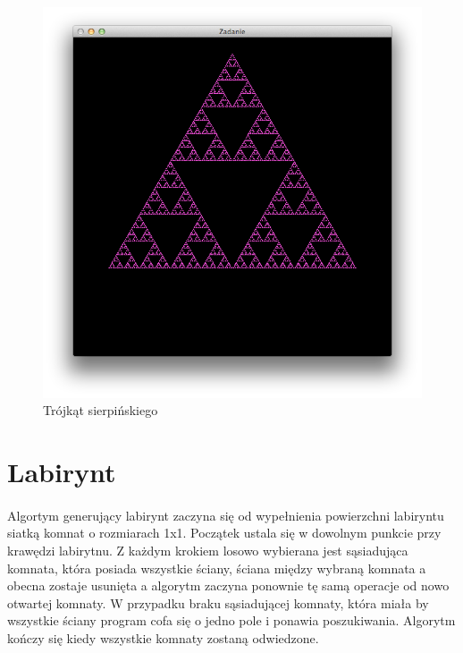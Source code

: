 \documentclass[wide,a4paper,titlepage,12pt] {article}
\begin{document}
  \paragraph{}

  

  \begin{figure}[htbp]
    \begin{center}
      \includegraphics[scale=0.6]{trojkat.png}
      \caption{Trójkąt sierpińskiego}
    \end{center}
  \end{figure}


  \newpage


  \section{Labirynt}
  \paragraph{}

  Algortym generujący labirynt zaczyna się od wypełnienia powierzchni labiryntu siatką komnat o rozmiarach 1x1.
  Początek ustala się w dowolnym punkcie przy krawędzi labirytnu.
  Z każdym krokiem losowo wybierana jest sąsiadująca komnata, która posiada wszystkie ściany,
  ściana między wybraną komnata a obecna zostaje usunięta a algorytm zaczyna ponownie tę samą operacje
  od nowo otwartej komnaty. W przypadku braku sąsiadującej komnaty, która miała by wszystkie ściany program cofa się o jedno pole i ponawia poszukiwania.
  Algorytm kończy się kiedy wszystkie komnaty zostaną odwiedzone.
\end{document}
